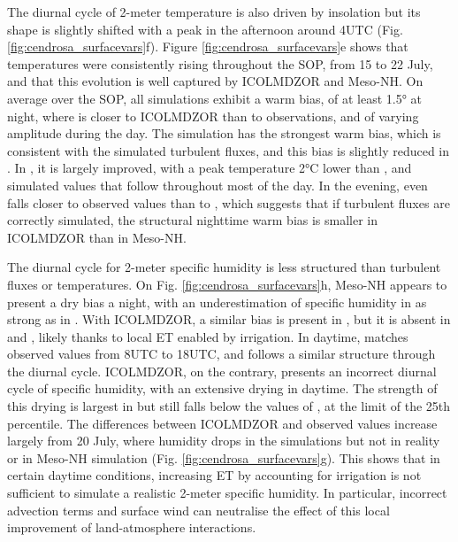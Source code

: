 The diurnal cycle of 2-meter temperature is also driven by insolation but its shape is slightly shifted with a peak in the afternoon around 4UTC (Fig. \ref{fig:cendrosa_surfacevars}f). Figure \ref{fig:cendrosa_surfacevars}e shows that temperatures were consistently rising throughout the SOP, from 15 to 22 July, and that this evolution is well captured by ICOLMDZOR and Meso-NH.
On average over the SOP, all simulations exhibit a warm bias, of at least 1.5° at night, where \mesoexact is closer to ICOLMDZOR than to observations, and of varying amplitude during the day. The \irr simulation has the strongest warm bias, which is consistent with the simulated turbulent fluxes, and this bias is slightly reduced in \irr. In \irrboost, it is largely improved, with a peak temperature 2°C lower than \irr, and simulated values that follow \mesomean throughout most of the day. In the evening, \irrboost even falls closer to observed values than to \mesomean, which suggests that if turbulent fluxes are correctly simulated, the structural nighttime warm bias is smaller in ICOLMDZOR than in Meso-NH.

The diurnal cycle for 2-meter specific humidity is less structured than turbulent fluxes or temperatures.
On Fig. \ref{fig:cendrosa_surfacevars}h, Meso-NH appears to present a dry bias a night, with an underestimation of specific humidity in \mesoexact as strong as in \mesomean. With ICOLMDZOR, a similar bias is present in \noirr, but it is absent in \irr and \irrboost, likely thanks to local ET enabled by irrigation.
In daytime, \mesoexact matches observed values from 8UTC to 18UTC, and \mesomean follows a similar structure through the diurnal cycle. 
ICOLMDZOR, on the contrary, presents an incorrect diurnal cycle of specific humidity, with an extensive drying in daytime. The strength of this drying is largest in \noirr but \irrboost still falls below the values of \mesomean, at the limit of the 25th percentile. 
The differences between ICOLMDZOR and observed values increase largely from 20 July, where humidity drops in the simulations but not in reality or in Meso-NH simulation (Fig. \ref{fig:cendrosa_surfacevars}g).
This shows that in certain daytime conditions, increasing ET by accounting for irrigation is not sufficient to simulate a realistic 2-meter specific humidity. In particular, incorrect advection terms and surface wind can neutralise the effect of this local improvement of land-atmosphere interactions.


